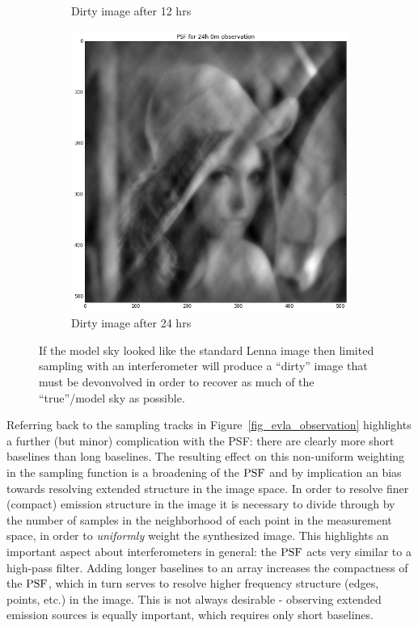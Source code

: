 \begin{figure}[ht!]
\begin{mdframed}
\begin{subfigure}[b]{0.34\textwidth}
  \caption{Dirty image after 12 hrs}
 \end{subfigure}
 \begin{subfigure}[b]{0.34\textwidth}
  \includegraphics[width=\textwidth]{images/evla_lena_observation/24hr.png}
  \caption{Dirty image after 24 hrs}
 \end{subfigure}
 \caption[Effect of observation time on dirty image synthesis]{If the model sky looked like the standard Lenna image then limited sampling with an interferometer will produce a ``dirty'' image that
 must be devonvolved in order to recover as much of the ``true''/model sky as possible.}
  \label{fig_model_convolution}
 \end{mdframed}
\end{figure}

Referring back to the sampling tracks in Figure~\ref{fig_evla_observation} highlights a further (but minor) complication with the PSF: there are clearly more short baselines than long baselines. The resulting effect on this non-uniform
weighting in the sampling function is a broadening of the $\textrm{PSF}$ and by implication an bias towards resolving extended structure in the image space. In order to resolve finer (compact) emission structure in the image
it is necessary to divide through by the number of samples in the neighborhood of each point in the measurement space, in order to \emph{uniformly} weight the synthesized image. This highlights an important aspect about
interferometers in general: the $\textrm{PSF}$ acts very similar to a high-pass filter. Adding longer baselines to an array increases the compactness of the $\textrm{PSF}$, which in turn serves to resolve higher frequency structure (edges, points, etc.)
in the image. This is not always desirable - observing extended emission sources is equally important, which requires only short baselines.

